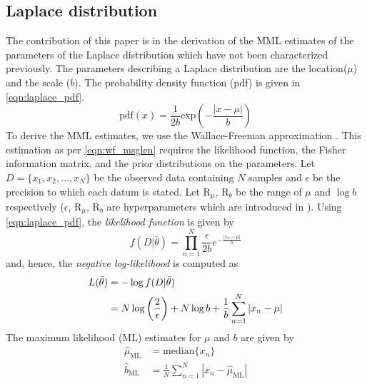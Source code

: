 \documentclass[wcp]{jmlr}
\begin{document}
\subsection{Laplace distribution}
The contribution of this paper is in the derivation of the MML estimates of 
the parameters of the Laplace distribution which have not been characterized previously.
The parameters describing a Laplace distribution are the location($\mu$) and the scale ($b$).
The probability density function (pdf) is given in \eqref{eqn:laplace_pdf}.
\begin{equation}
\mathrm{pdf}(x) = \frac{1}{2b}\mathrm{exp}\left(-\frac{|x-\mu|}{b}\right) \label{eqn:laplace_pdf}
\end{equation}
To derive the MML estimates, we use the Wallace-Freeman approximation \citep{wallace-87}. 
This estimation as per \eqref{eqn:wf_msglen} requires the likelihood function, the Fisher information matrix,
and the  prior distributions on the parameters. Let $D = \{x_1,x_2,\ldots,x_N\}$ be the observed data 
containing $N$ samples and $\epsilon$ be the precision to which each datum is stated. 
Let $\mathrm{R}_{\mu}$, $\mathrm{R}_{b}$ be the range of $\mu$ and $\log b$ 
respectively ($\epsilon$, $\mathrm{R}_{\mu}$, $\mathrm{R}_{b}$ are hyperparameters
which are introduced in \citet{WallaceBook}). Using \eqref{eqn:laplace_pdf},
the \emph{likelihood function} is given by
\[ f(D|\bar{\theta}) = \prod_{n=1}^N \frac{\epsilon}{2b} e^{-\frac{|x_n-\mu|}{b}} \]
and, hence, the \emph{negative log-likelihood} is computed as
\begin{align}
 L(\bar{\theta}) &= -\log f(D|\bar{\theta}) \notag\\
		 &= N\log\left(\frac{2}{\epsilon}\right) + N\log b + \frac{1}{b}\sum_{n=1}^N |x_n-\mu| \label{eqn:laplace_l}
\end{align}
The maximum likelihood (ML) estimates for $\mu$ and $b$ are given by
\begin{align*}
\hat{\mu}_{\mathrm{ML}} &= \mathrm{median}\{x_n\} \\ 
\hat{b}_{\mathrm{ML}} &= \frac{1}{N} \sum_{n=1}^N |x_n-\hat{\mu}_{\mathrm{ML}}|
\end{align*}
\end{document}
